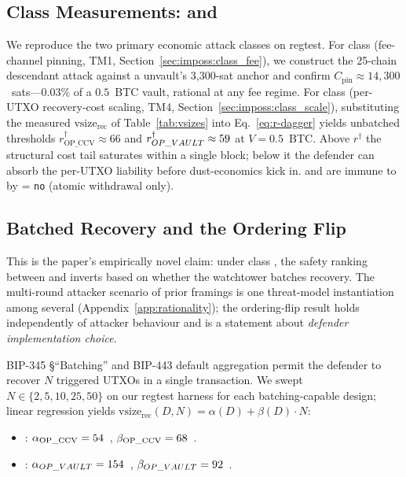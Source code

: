 \subsection{Class Measurements: \classfee{} and \classscale{}}
\label{sec:emp:attacks}
\label{sec:empirical:classes}

We reproduce the two primary economic attack classes on regtest. For
class \classfee{} (fee-channel pinning, TM1,
Section~\ref{sec:imposs:class_fee}), we construct the 25-chain
descendant attack against a \opctv{} unvault's 3{,}300-sat anchor and
confirm $C_{\text{pin}} \approx 14{,}300$~sats---$0.03\%$ of a
$0.5$~BTC vault, rational at any fee regime. For class \classscale{}
(per-UTXO recovery-cost scaling, TM4,
Section~\ref{sec:imposs:class_scale}), substituting the measured
$\text{vsize}_{\text{rec}}$ of Table~\ref{tab:vsizes} into
Eq.~\ref{eq:r-dagger} yields unbatched thresholds
$r^\dagger_{\mathrm{OP\_CCV}} \approx 66$\satvB{} and
$r^\dagger_{OP\_VAULT{}} \approx 59$\satvB{} at $V = 0.5$~BTC. Above
$r^\dagger$ the structural cost tail saturates within a single block;
below it the defender can absorb the per-UTXO liability before
dust-economics kick in. \opctv{} and \catcsfs{} are immune to
\classscale{} by \axrevault{} = \texttt{no} (atomic withdrawal only).

\subsection{Batched Recovery and the Ordering Flip}
\label{sec:empirical:batching}

This is the paper's empirically novel claim: under class \classscale{},
the safety ranking between \opccv{} and \opvault{} inverts based on
whether the watchtower batches recovery. The multi-round attacker
scenario of prior framings is one threat-model instantiation
among several (Appendix~\ref{app:rationality}); the ordering-flip
result holds independently of attacker behaviour and is a statement
about \emph{defender implementation choice}.

BIP-345 §``Batching'' and BIP-443 default aggregation permit the
defender to recover $N$ triggered UTXOs in a single transaction. We
swept $N \in \{2, 5, 10, 25, 50\}$ on our regtest harness for each
batching-capable design; linear regression yields
$\text{vsize}_{\text{rec}}(D, N) = \alpha(D) + \beta(D) \cdot N$:
\begin{itemize}
  \item \opccv{}: $\alpha_{\mathrm{OP\_CCV}} = 54$~\vB{},
    $\beta_{\mathrm{OP\_CCV}} = 68$~\vB{}.
  \item \opvault{}: $\alpha_{OP\_VAULT{}} = 154$~\vB{},
    $\beta_{OP\_VAULT{}} = 92$~\vB{}.
\end{itemize}

